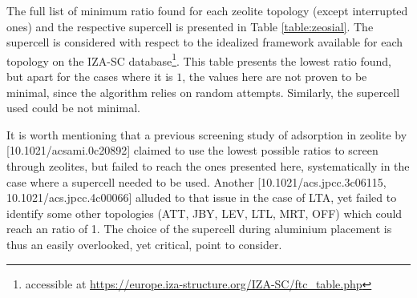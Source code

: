 \documentclass[main.tex]{subfiles}
\begin{document}
The full list of minimum \SiAl ratio found for each zeolite topology (except interrupted ones) and the respective supercell is presented in Table \ref{table:zeosial}. The supercell is considered with respect to the idealized framework available for each topology on the IZA-SC database\footnote{accessible at \url{https://europe.iza-structure.org/IZA-SC/ftc_table.php}}. This table presents the lowest \SiAl ratio found, but apart for the cases where it is $1$, the values here are not proven to be minimal, since the algorithm relies on random attempts. Similarly, the supercell used could be not minimal.

It is worth mentioning that a previous screening study of adsorption in zeolite by [10.1021/acsami.0c20892] claimed to use the lowest possible \SiAl ratios to screen through zeolites, but failed to reach the ones presented here, systematically in the case where a supercell needed to be used. Another [10.1021/acs.jpcc.3c06115, 10.1021/acs.jpcc.4c00066] alluded to that issue in the case of LTA, yet failed to identify some other topologies (ATT, JBY, LEV, LTL, MRT, OFF) which could reach an \SiAl ratio of 1. The choice of the supercell during aluminium placement is thus an easily overlooked, yet critical, point to consider.
\end{document}

